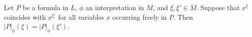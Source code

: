 Let $P$ be a formula in $L$, $\phi$ an interpretation in $M$, and $\xi, \xi' \in \overline{M}$. Suppose that $x^\xi$ coincides with $x^{\xi'}$ for all variables $x$ occurring freely in $P$. Then $|P|_\phi(\xi) = |P|_\phi(\xi')$.
